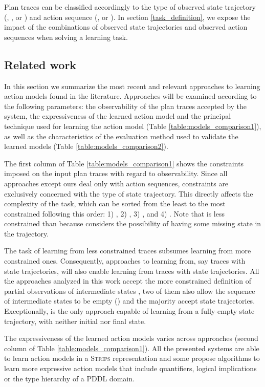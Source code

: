 Plan traces can be classified accordingly to the type of observed state trajectory (\FO, \POstar, \PO or \NO) and action sequence (\FO, \PO or \NO). In section \ref{task_definition}, we expose the impact of the combinations of observed state trajectories and observed action sequences when solving a learning task.



\subsection{Related work}
\label{related_work}

In this section we summarize the most recent and relevant approaches to learning action models found in the literature. Approaches will be examined according to the following parameters: the observability of the plan traces accepted by the system, the expressiveness of the learned action model and the principal technique used for learning the action model (Table \ref{table:models_comparison1}), as well as the characteristics of the evaluation method used to validate the learned models (Table \ref{table:models_comparison2}).

The first column of Table \ref{table:models_comparison1} shows the constraints imposed on the input plan traces with regard to observability. Since all approaches except ours deal only with \FO action sequences, constraints are exclusively concerned with the type of state trajectory. This directly affects the complexity of the task, which can be sorted from the least to the most constrained following this order: 1) \NO, 2) \PO, 3) \POstar, and 4) \FO. Note that \PO is less constrained than \POstar because \PO considers the possibility of having some missing state in the trajectory.

The task of learning from less constrained traces subsumes learning from more constrained ones. Consequently, approaches to learning from, say traces with \PO state trajectories, will also enable learning from traces with \POstar state trajectories. All the approaches analyzed in this work accept the more constrained definition of partial observations of intermediate states \POstar, two of them also allow the sequence of intermediate states to be empty (\PO) and the majority accept \NO state trajectories. Exceptionally, \LOCM is the only approach capable of learning from a fully-empty state trajectory, with neither initial nor final state.


The expressiveness of the learned action models varies across approaches (second column of Table \ref{table:models_comparison1}). All the presented systems are able to learn action models in a \textsc{Strips}  representation \cite{fikes1971strips} and some propose algorithms to learn more expressive action models that include quantifiers, logical implications or the type hierarchy of a PDDL domain.

